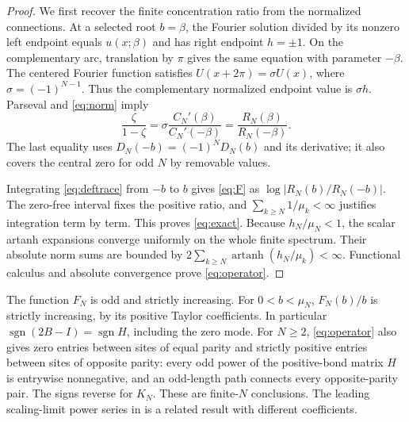 \documentclass[10pt]{article}
\newcommand{\artanh}{\operatorname{artanh}}
\begin{document}
\begin{proof}
We first recover the finite concentration ratio from the normalized
connections. At a selected root $b=\beta$, the Fourier solution divided
by its nonzero left endpoint equals $u(x;\beta)$ and has right endpoint
$h=\pm1$. On the complementary arc, translation by $\pi$ gives the
same equation with parameter $-\beta$. The centered Fourier function
satisfies $U(x+2\pi)=\sigma U(x)$, where $\sigma=(-1)^{N-1}$.
Thus the complementary normalized endpoint value is $\sigma h$.
Parseval and \eqref{eq:norm} imply
\[
\frac{\zeta}{1-\zeta}
=\sigma\frac{C_N'(\beta)}{C_N'(-\beta)}
=\frac{R_N(\beta)}{R_N(-\beta)}.
\]
The last equality uses $D_N(-b)=(-1)^ND_N(b)$ and its derivative;
it also covers the central zero for odd $N$ by removable values.

Integrating \eqref{eq:deftrace} from $-b$ to $b$ gives \eqref{eq:F}
as $\log|R_N(b)/R_N(-b)|$. The zero-free interval fixes the positive
ratio, and $\sum_{k\ge N}1/\mu_k<\infty$ justifies integration term by
term. This proves \eqref{eq:exact}.
Because $h_N/\mu_N<1$, the scalar artanh expansions converge uniformly
on the whole finite spectrum. Their absolute norm sums are bounded by
$2\sum_{k\ge N}\artanh(h_N/\mu_k)<\infty$.
Functional calculus and absolute convergence prove \eqref{eq:operator}.
\end{proof}

The function $F_N$ is odd and strictly increasing. For $0<b<\mu_N$,
$F_N(b)/b$ is strictly increasing, by its positive Taylor coefficients.
In particular $\operatorname{sgn}(2B-I)=\operatorname{sgn}H$,
including the zero mode. For $N\ge2$, \eqref{eq:operator} also gives
zero entries between sites of equal parity and strictly positive
entries between sites of opposite parity: every odd power of the
positive-bond matrix $H$ is entrywise nonnegative, and an odd-length
path connects every opposite-parity pair. The signs reverse for $K_N$.
These are finite-$N$ conclusions. The leading scaling-limit power
series in \cite{eisler} is a related result with different coefficients.
\end{document}

